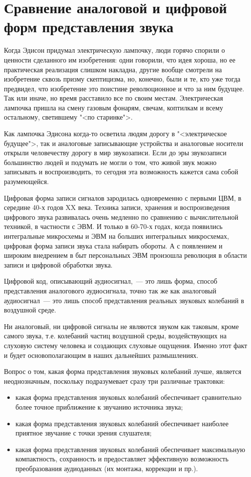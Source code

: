 \documentclass[oneside, final, 14pt]{extreport}
\begin{document}
\section{Сравнение аналоговой и цифровой форм представления звука}
Когда Эдисон придумал электрическую лампочку, люди горячо спорили о ценности сделанного им изобретения: одни говорили, что идея хороша, но ее практическая реализация слишком накладна, другие вообще смотрели
на изобретение сквозь призму скептицизма, но, конечно, были и те, кто уже тогда предвидел, что изобретение это поистине революционное и что за ним будущее. Так или иначе, но время расставило все по своим местам. Электрическая лампочка пришла на смену газовым фонарям, свечам, коптилкам и всему остальному, светившему "<по старинке">.

Как лампочка Эдисона когда-то осветила людям дорогу в "<электрическое будущее">, так и аналоговые записывающие устройства и аналоговые носители открыли человечеству дорогу в мир звукозаписи. Если до эры звукозаписи большинство людей и подумать не могли о том, что живой звук можно записывать и воспроизводить, то сегодня эта возможность кажется сама собой разумеющейся.

Цифровая форма записи сигналов зародилась одновременно с первыми ЦВМ, в середине 40-х годов XX века. Техника записи, хранения и воспроизведения цифрового звука развивалась очень медленно по сравнению с вычислительной техникой, в частности с ЭВМ. И только в 60-70-х годах, когда появились интегральные микросхемы и ЭВМ на больших интегральных микросхемах, цифровая форма записи звука стала набирать обороты. А с появлением и широким внедрением в быт персональных ЭВМ произошла революция в области записи и цифровой обработки звука.

Цифровой код, описывающий аудиосигнал,~--- это лишь форма, способ представления аналогового аудиосигнала, точно так же как аналоговый аудиосигнал~--- это лишь способ представления реальных звуковых колебаний в воздушной среде. 

Ни аналоговый, ни цифровой сигналы не являются звуком как таковым, кроме самого звука, т.е. колебаний частиц воздушной среды, воздействующих на слуховую систему человека и создающих слуховые ощущения. Именно этот факт и будет основополагающим в наших дальнейших размышлениях.

Вопрос о том, какая форма представления звуковых колебаний лучше, является неоднозначным, поскольку подразумевает сразу три различные трактовки:
\begin{itemize}
\item какая форма представления звуковых колебаний обеспечивает сравнительно более точное приближение к звучанию источника звука;
\item какая форма представления звуковых колебаний обеспечивает наиболее приятное звучание с точки зрения слушателя;
\item какая форма представления звуковых колебаний обеспечивает максимальную компактность, сохранность и предоставляет эффективную возможность преобразования аудиоданных (их монтажа, коррекции и пр.).
\end{itemize}
\end{document}
